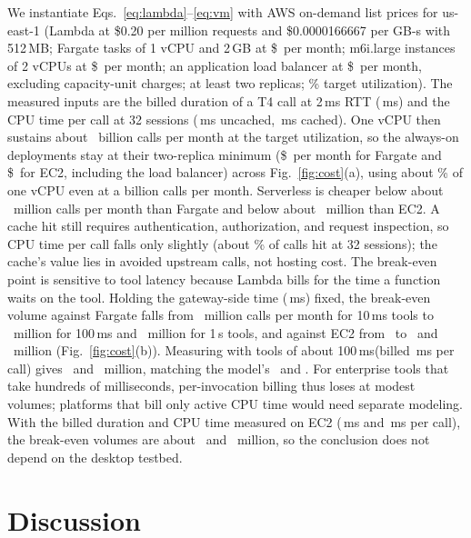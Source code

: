 \documentclass{ieeeaccess}
\newcommand{\ms}{\,ms\xspace}
\begin{document}
We instantiate Eqs.~\eqref{eq:lambda}--\eqref{eq:vm} with AWS on-demand list prices for us-east-1 (Lambda at \$0.20 per million requests and \$0.0000166667 per GB-s with 512\,MB; Fargate tasks of 1 vCPU and 2\,GB at \$\kFargate\ per month; m6i.large instances of 2 vCPUs at \$\kEcTwo\ per month; an application load balancer at \$\kAlb\ per month, excluding capacity-unit charges; at least two replicas; \kUtil\% target utilization). The measured inputs are the billed duration of a T4 call at 2\ms RTT (\kBilled\ms) and the CPU time per call at 32 sessions (\kCpuUnc\ms uncached, \kCpuC\ms cached). One vCPU then sustains about \kCapVcpu\ billion calls per month at the target utilization, so the always-on deployments stay at their two-replica minimum (\$\kFargateMin\ per month for Fargate and \$\kEcTwoMin\ for EC2, including the load balancer) across Fig.~\ref{fig:cost}(a), using about \kVcpuShareThousand\% of one vCPU even at a billion calls per month. Serverless is cheaper below about \kBreakevenFg\ million calls per month than Fargate and below about \kBreakeven\ million than EC2. A cache hit still requires authentication, authorization, and request inspection, so CPU time per call falls only slightly (about \kHitAtThirtyTwo\% of calls hit at 32 sessions); the cache's value lies in avoided upstream calls, not hosting cost. 
The break-even point is sensitive to tool latency because Lambda bills for the time a function waits on the tool. Holding the gateway-side time (\kGwSide\ms) fixed, the break-even volume against Fargate falls from \kBeFgTen\ million calls per month for 10\ms tools to \kBeFgHundred\ million for 100\ms and \kBeFgThousand\ million for 1\,s tools, and against EC2 from \kBeTen\ to \kBeHundred\ and \kBeThousand\ million (Fig.~\ref{fig:cost}(b)). Measuring with tools of about 100\ms (billed \hBilled\ms per call) gives \hBreakevenFg\ and \hBreakeven\ million, matching the model's \kBeFgHundred\ and \kBeHundred. For enterprise tools that take hundreds of milliseconds, per-invocation billing thus loses at modest volumes; platforms that bill only active CPU time would need separate modeling. With the billed duration and CPU time measured on EC2 (\awBilled\ms and \awCpuUnc\ms per call), the break-even volumes are about \awBreakevenFg\ and \awBreakeven\ million, so the conclusion does not depend on the desktop testbed.

\section{Discussion}
\label{sec:discussion}
\end{document}
